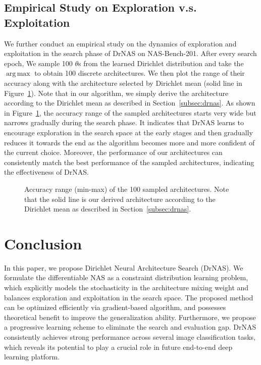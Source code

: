 \documentclass{article} \usepackage{iclr2021_conference,times}
\DeclareMathOperator*{\argmax}{arg\,max}
\begin{document}
\subsection{Empirical Study on Exploration v.s. Exploitation}
\label{sec:ee}
We further conduct an empirical study on the dynamics of exploration and exploitation in the search phase of DrNAS on NAS-Bench-201.
After every search epoch, We sample 100 $\theta$s from the learned Dirichlet distribution and take the $\argmax$ to obtain 100 discrete architectures. We then plot the range of their accuracy along with the architecture selected by Dirichlet mean (solid line in Figure~\ref{fig:exploration201}).
Note that in our algorithm, we simply derive the architecture according to the Dirichlet mean as described in Section~\ref{subsec:drnas}.
As shown in Figure~\ref{fig:exploration201}, the accuracy range of the sampled architectures starts very wide but narrows gradually during the search phase.
It indicates that DrNAS learns to encourage exploration in the search space at the early stages and then gradually reduces it towards the end as the algorithm becomes more and more confident of the current choice.
Moreover, the performance of our architectures can consistently match the best performance of the sampled architectures, indicating the effectiveness of DrNAS.




\begin{figure}[ht!]
    \vspace{-1.5mm}
\begin{minipage}{1.\linewidth}
    \centering
    \end{minipage}\caption{
Accuracy range (min-max) of the 100 sampled architectures. Note that the solid line is our derived architecture according to the Dirichlet mean as described in Section~\ref{subsec:drnas}.
}
    \label{fig:exploration201}
    \vspace{-2.0mm}
\end{figure}


\section{Conclusion}
In this paper, we propose Dirichlet Neural Architecture Search (DrNAS). We formulate the differentiable NAS as a constraint distribution learning problem, which explicitly models the stochasticity in the architecture mixing weight and balances exploration and exploitation in the search space. 
The proposed method can be optimized efficiently via gradient-based algorithm, and possesses theoretical benefit to improve the generalization ability.
Furthermore, we propose a progressive learning scheme to eliminate the search and evaluation gap.
DrNAS consistently achieves strong performance across several image classification tasks, which reveals its potential to play a crucial role in future end-to-end deep learning platform.
\end{document}
